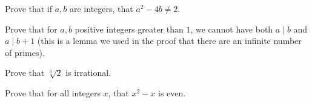\begin{prob}  Prove that if $a,b$ are integers, that $a^2-4b\neq 2$.  \end{prob}  

\begin{prob}  Prove that for $a,b$ positive integers greater than $1$, we cannot have both $a\mid b$ and $a\mid b+1$ (this is a lemma we used in the proof that there are an infinite number of primes).  \end{prob}

\begin{prob}  Prove that $\sqrt[3]{2}$ is irrational.  \end{prob} 

\begin{prob}  Prove that for all integers $x$, that $x^2-x$ is even.  \end{prob}




